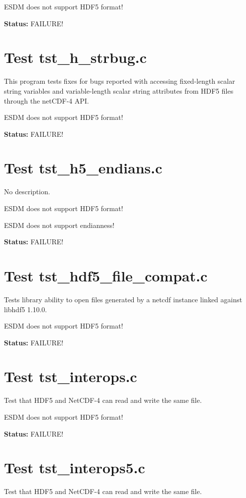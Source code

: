ESDM does not support HDF5 format!

{\bf \large Status: } FAILURE!

\section{Test tst\_h\_strbug.c}

This program tests fixes for bugs reported with accessing fixed-length scalar string variables and variable-length scalar string attributes from HDF5 files through the netCDF-4 API.

ESDM does not support HDF5 format!

{\bf \large Status: } FAILURE!

\section{Test tst\_h5\_endians.c}

No description.

ESDM does not support HDF5 format!

ESDM does not support endianness!

{\bf \large Status: } FAILURE!

\section{Test tst\_hdf5\_file\_compat.c}

Tests library ability to open files generated by a netcdf instance linked against libhdf5 1.10.0.

ESDM does not support HDF5 format!

{\bf \large Status: } FAILURE!

\section{Test tst\_interops.c}

Test that HDF5 and NetCDF-4 can read and write the same file.

ESDM does not support HDF5 format!

{\bf \large Status: } FAILURE!

\section{Test tst\_interops5.c}

Test that HDF5 and NetCDF-4 can read and write the same file.

